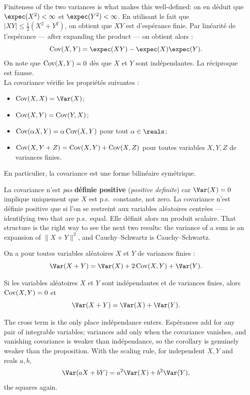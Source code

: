 Finiteness of the two variances is what makes this well-defined: on en déduit
que $\expec(X^{2}) < \infty$ et $\expec(Y^{2}) < \infty$. En utilisant le fait
que $|XY| \le \tfrac{1}{2}(X^{2} + Y^{2})$, on obtient que $XY$ est d'espérance
finie. Par linéarité de l'espérance --- after expanding the product --- on
obtient alors :
\[ \Cov(X,Y) = \expec(XY) - \expec(X)\expec(Y). \]
On note que $\operatorname{Cov}(X,Y) = 0$ dès que $X$ et $Y$ sont indépendantes. La
réciproque est fausse.\\

La covariance vérifie les propriétés suivantes :
\begin{itemize}
  \item $\Cov(X,X) = \Var(X)$;
  \item $\operatorname{Cov}(X,Y) = \operatorname{Cov}(Y,X)$;
  \item $\operatorname{Cov}(\alpha X, Y) = \alpha \operatorname{Cov}(X,Y)$ pour tout $\alpha \in \reals$;
  \item $\operatorname{Cov}(X, Y+Z) = \operatorname{Cov}(X,Y) + \operatorname{Cov}(X,Z)$ pour toutes variables $X,Y,Z$ de
    variances finies.
\end{itemize}
En particulier, la covariance est une forme bilinéaire symétrique.

\begin{remark}
  La covariance n'est \emph{pas} \textbf{définie positive} (\textit{positive
  definite}) car $\Var(X) = 0$ implique uniquement que $X$ est p.s.\ constante,
  not zero. La covariance n'est définie positive que si l'on se restreint aux
  variables aléatoires centrées --- identifying two that are p.s.\ equal. Elle
  définit alors un produit scalaire.
  That structure is the right way to see the next two results: the variance of a
  sum is an expansion of $\|X+Y\|^{2}$, and Cauchy--Schwartz is Cauchy--Schwartz.
\end{remark}

\begin{prop}
  On a pour toutes variables aléatoires $X$ et $Y$ de variances finies :
  \[ \Var(X+Y) = \Var(X) + 2\Cov(X,Y) + \Var(Y). \]
\end{prop}

\begin{corollary}
  Si les variables aléatoires $X$ et $Y$ sont indépendantes et de variances
  finies, alors $\operatorname{Cov}(X,Y) = 0$ et
  \[ \Var(X+Y) = \Var(X) + \Var(Y). \]
\end{corollary}

The cross term is the only place indépendance enters. Espérances add for any
pair of integrable variables; variances add only when the covariance vanishes,
and vanishing covariance is weaker than indépendance, so the corollary is
genuinely weaker than the proposition. With the scaling rule, for independent
$X, Y$ and reals $a, b$,
\[ \Var(aX + bY) = a^{2}\Var(X) + b^{2}\Var(Y), \]
the squares again.

